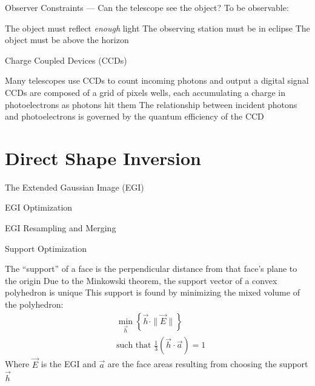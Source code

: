 \documentclass{beamer}
\begin{document}
\begin{frame}{Observer Constraints --- Can the telescope see the object?}
    To be observable:
    \begin{outline}
        \1 The object must reflect \textit{enough} light
        \1 The observing station must be in eclipse
        \1 The object must be above the horizon
    \end{outline}
\end{frame}

\begin{frame}{Charge Coupled Devices (CCDs)}
    \begin{outline}
        \1 Many telescopes use CCDs to count incoming photons and output a digital signal
        \1 CCDs are composed of a grid of pixels wells, each accumulating a charge in photoelectrons as photons hit them
        \2 The relationship between incident photons and photoelectrons is governed by the quantum efficiency of the CCD
    \end{outline}
\end{frame}

\section{Direct Shape Inversion}

\begin{frame}{The Extended Gaussian Image (EGI)}
\end{frame}

\begin{frame}{EGI Optimization}
\end{frame}

\begin{frame}{EGI Resampling and Merging}
\end{frame}

\begin{frame}{Support Optimization}
    \begin{outline}
        \1 The ``support'' of a face is the perpendicular distance from that face's plane to the origin
        \1 Due to the Minkowski theorem, the support vector of a convex polyhedron is unique
        \1 This support is found by minimizing the mixed volume of the polyhedron:
        \begin{align*}
            & \min_{\vec{h}}\left\{ \vec{h} \cdot \| \vec{E} \| \right\} \\
            & \textrm{such that } \frac{1}{3}\left(\vec{h} \cdot \vec{a} \right) = 1          
        \end{align*}
        \1 Where $\vec{E}$ is the EGI and $\vec{a}$ are the face areas resulting from choosing the support $\vec{h}$
    \end{outline}
\end{frame}
\end{document}
